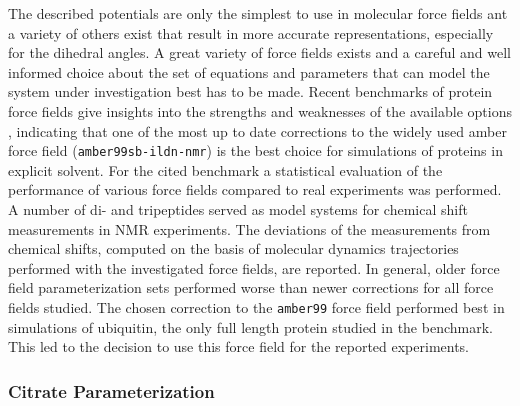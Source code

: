 \documentclass[english, a4paper, 12pt, titlepage, draft]{article}
\begin{document}
The described potentials are only the simplest to use in molecular force fields ant a variety of others exist that result in more accurate representations, especially for the dihedral angles.
A great variety of force fields exists and a careful and well informed choice about the set of equations and parameters that can model the system under investigation best has to be made.
Recent benchmarks of protein force fields give insights into the strengths and weaknesses of the available options \cite{proteinFF}, indicating that one of the most up to date corrections to the widely used amber force field (\texttt{amber99sb-ildn-nmr}) \cite{amber99sb-ildn-nmr} is the best choice for simulations of proteins in explicit solvent.
For the cited benchmark a statistical evaluation of the performance of various force fields compared to real experiments was performed.
A number of di- and tripeptides served as model systems for chemical shift measurements in NMR experiments.
The deviations of the measurements from chemical shifts, computed on the basis of molecular dynamics trajectories performed with the investigated force fields, are reported.
In general, older force field parameterization sets performed worse than newer corrections for all force fields studied.
The chosen correction to the \texttt{amber99} force field performed best in simulations of ubiquitin, the only full length protein studied in the benchmark.
This led to the decision to use this force field for the reported experiments.


\subsubsection{Citrate Parameterization}
\end{document}
